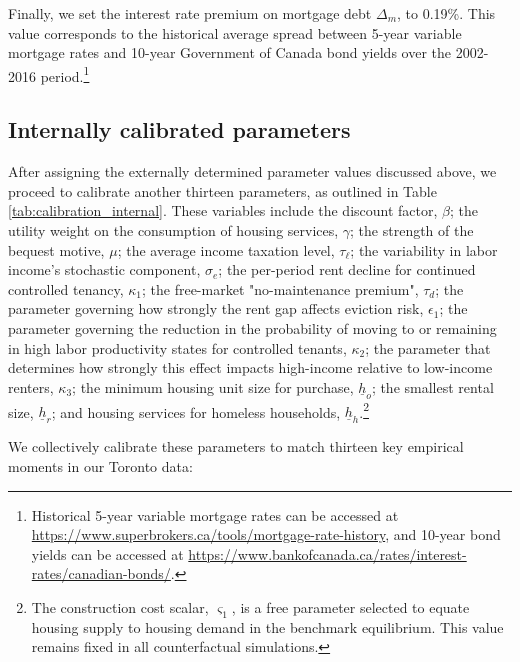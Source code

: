 \documentclass[parskip=full]{article}
\begin{document}
Finally, we set the interest rate premium on mortgage debt $\Delta_{m}$, to 0.19\%. This value corresponds to the historical average spread between 5-year variable mortgage rates and 10-year Government of Canada bond yields over the 2002-2016 period.\footnote{Historical 5-year variable mortgage rates can be accessed at \url{https://www.superbrokers.ca/tools/mortgage-rate-history}, and 10-year bond yields can be accessed at \url{https://www.bankofcanada.ca/rates/interest-rates/canadian-bonds/}.}

\subsection{Internally calibrated parameters}

After assigning the externally determined parameter values discussed above, we proceed to calibrate another thirteen parameters, as outlined in Table \ref{tab:calibration_internal}. These variables include the discount factor, $\beta$; the utility weight on the consumption of housing services, $\gamma$; the strength of the bequest motive, $\mu$; the average income taxation level, $\tau_{\ell}$; the variability in labor income's stochastic component, $\sigma_{e}$; the per-period rent decline for continued controlled tenancy, $\kappa_1$; the free-market "no-maintenance premium", $\tau_d$; the parameter governing how strongly the rent gap affects eviction risk, $\epsilon_1$; the parameter governing the reduction in the probability of moving to or remaining in high labor productivity states for controlled tenants, $\kappa_2$; the parameter that determines how strongly this effect impacts high-income relative to low-income renters, $\kappa_3$; the minimum housing unit size for purchase, $\underline{h}_{o}$; the smallest rental size, $\underline{h}_{r}$; and housing services for homeless households, $\underline{h}_{h}$.\footnote{The construction cost scalar, $\varsigma_{1}$, is a free parameter selected to equate housing supply to housing demand in the benchmark equilibrium. This value remains fixed in all counterfactual simulations.}

We collectively calibrate these parameters to match thirteen key empirical moments in our Toronto data:
\end{document}
